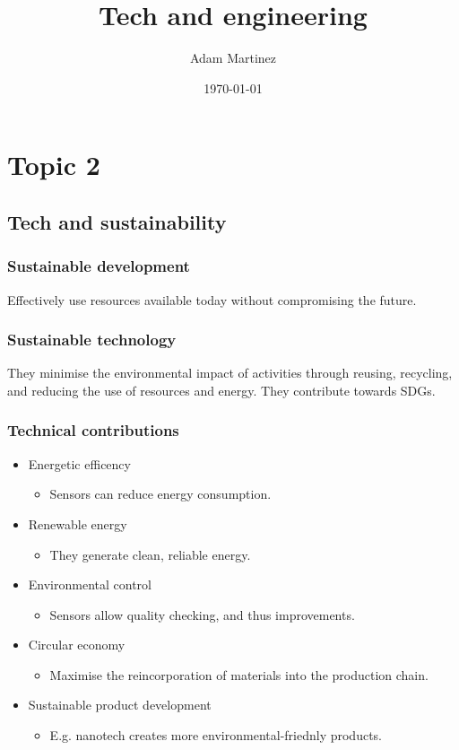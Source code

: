 \documentclass[12pt]{article}
\title{Tech and engineering}
\author{Adam Martinez}
\date{\today}
\begin{document}
\maketitle

\section*{Topic 2}

\subsection*{Tech and sustainability}

\subsubsection*{Sustainable development}

Effectively use resources available today without compromising the future.

\subsubsection*{Sustainable technology}

They minimise the environmental impact of activities through reusing, recycling,
and reducing the use of resources and energy.
They contribute towards SDGs.

\subsubsection*{Technical contributions}

\begin{itemize}
    \item Energetic efficency
    \begin{itemize}
        \item Sensors can reduce energy consumption.
    \end{itemize}
    \item Renewable energy
    \begin{itemize}
        \item They generate clean, reliable energy.
    \end{itemize}
    \item Environmental control
    \begin{itemize}
        \item Sensors allow quality checking, and thus improvements.
    \end{itemize}
    \item Circular economy
    \begin{itemize}
        \item Maximise the reincorporation of materials into the production
        chain.
    \end{itemize}
    \item Sustainable product development
    \begin{itemize}
        \item E.g. nanotech creates more environmental-friednly products.
    \end{itemize}
\end{itemize}
\end{document}
